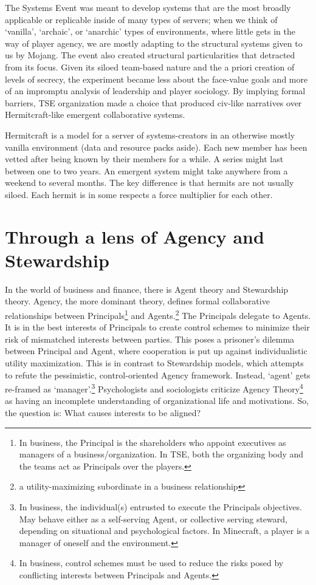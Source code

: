 The Systems Event was meant to develop systems that are the most broadly applicable or replicable inside of many types of servers; when we think of `vanilla', `archaic', or `anarchic' types of environments, where little gets in the way of player agency, we are mostly adapting to the structural systems given to us by Mojang. The event also created structural particularities that detracted from its focus. Given its siloed team-based nature and the a priori creation of levels of secrecy, the experiment became less about the face-value goals and more of an impromptu analysis of leadership and player sociology. By implying formal barriers, TSE organization made a choice that produced civ-like narratives over Hermitcraft-like emergent collaborative systems.

Hermitcraft is a model for a server of systems-creators in an otherwise mostly vanilla environment (data and resource packs aside). Each new member has been vetted after being known by their members for a while. A series might last between one to two years. An emergent system might take anywhere from a weekend to several months. The key difference is that hermits are not usually siloed. Each hermit is in some respects a force multiplier for each other.

\section{Through a lens of Agency and Stewardship}
In the world of business and finance, there is Agent theory and Stewardship theory. Agency, the more dominant theory, defines formal collaborative relationships between Principals\footnote{In business, the Principal is the shareholders who appoint executives as managers of a business/organization. In TSE, both the organizing body and the teams act as Principals over the players.} and Agents.\footnote{a utility-maximizing subordinate in a business relationship} The Principals delegate to Agents. It is in the best interests of Principals to create control schemes to minimize their risk of mismatched interests between parties. This poses a prisoner's dilemma between Principal and Agent, where cooperation is put up against individualistic utility maximization. This is in contrast to Stewardship models, which attempts to refute the pessimistic, control-oriented Agency framework. Instead, `agent' gets re-framed as `manager'.\footnote{In business, the individual(s) entrusted to execute the Principals objectives. May behave either as a self-serving Agent, or collective serving steward, depending on situational and psychological factors. In Minecraft, a player is a manager of oneself and the environment.} Psychologists and sociologists criticize Agency Theory\footnote{In business, control schemes must be used to reduce the risks posed by conflicting interests between Principals and Agents.} as having an incomplete understanding of organizational life and motivations. So, the question is: What causes interests to be aligned?~\citep{Davis(1997)}

